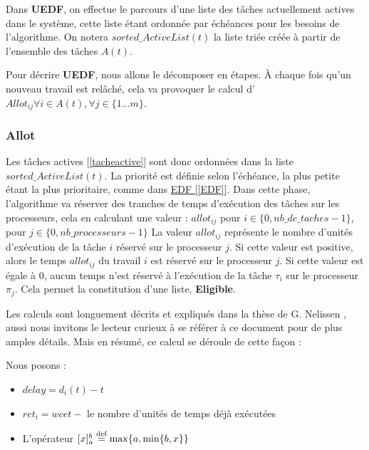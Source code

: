 	Dans \textbf{UEDF}, on effectue le parcours d'une liste des tâches actuellement actives dans le système, 
	cette liste étant ordonnée par échéances pour les besoins de l'algorithme. 
	On notera $sorted\_ActiveList(t)$ la liste triée créée à partir de l'ensemble des tâches $A(t)$.\newline
	
	Pour décrire \textbf{UEDF}, nous allons le décomposer en étapes.
	À chaque fois qu'un nouveau travail est relâché, cela va provoquer le calcul d'$Allot_{ij} \forall i \in A(t), \forall j \in \{1 ... m\}$.

	\subsubsection{Allot}\label{allot}
	Les tâches actives [\ref*{tacheactive}] sont donc ordonnées dans la liste $sorted\_ActiveList(t)$. 
	La priorité est définie selon l'échéance, la plus petite étant la plus prioritaire, comme dans \hyperref[EDF]{EDF [\ref*{EDF}]}.
	Dans cette phase, l'algorithme va \og{}réserver\fg{} des tranches de temps d'exécution des tâches sur les 
	processeurs, cela en calculant une valeur : \newline
	$allot_{ij}$ pour $i \in \{0, nb\_de\_taches - 1\}$, pour $j \in \{0, nb\_processeurs - 1\}$
	La valeur $allot_{ij}$ représente le nombre d'unités d'exécution de la tâche $i$ réservé sur le processeur $j$.\newline
	Si cette valeur est positive, alors le temps $allot_{ij}$ du travail $i$ est réservé sur le 
	processeur $j$. Si cette valeur est égale à $0$, aucun temps n'est réservé 
	à l'exécution de la tâche $\tau_i$ sur le processeur $\pi_j$. Cela permet la constitution d'une liste, 
	\textbf{Eligible}.\newline


	Les calculs sont longuement décrits et expliqués dans la thèse de G. Nelissen \cite{nelissen_u-edf_2012}, aussi nous invitons 
	le lecteur curieux à se référer à ce document pour de plus amples détails. Mais en résumé, 
	ce calcul se déroule de cette façon :
	
	Nous posons :
	\begin{itemize}
		\setlength\itemsep{0.1em}
		\item $delay = d_i(t) - t$
		\item $ret_i = wcet - $ le nombre d'unités de temps déjà exécutées
		\item L'opérateur $[x]_a^b \stackrel{\text{def}}{=} \max\{a, \min\{b, x \}\}$
	\end{itemize}

